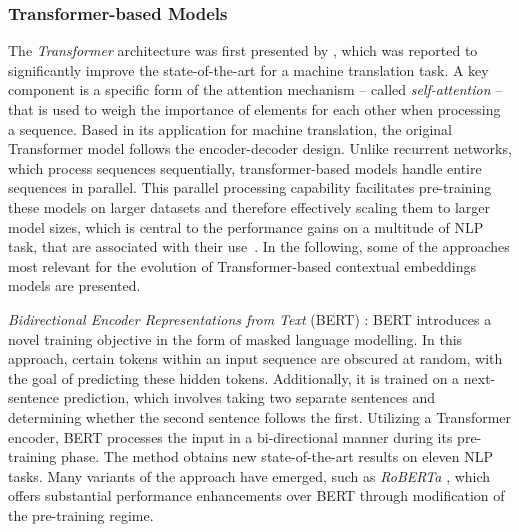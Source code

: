 \documentclass[11pt]{scrreprt}
\let\cite\parencite  %
\begin{document}
\subsubsection{Transformer-based Models}
The \textit{Transformer} architecture was first presented by \cite{vaswaniAttentionAllYou2017}, which was reported to significantly improve the state-of-the-art for a  machine translation task. A key component is a specific form of the attention mechanism -- called \textit{self-attention} -- that is used to weigh the importance of elements for each other when processing a sequence. Based in its application for machine translation, the original Transformer model follows the encoder-decoder design. Unlike recurrent networks, which process sequences sequentially, transformer-based models handle entire sequences in parallel. This parallel processing capability facilitates pre-training these models on larger datasets and therefore effectively scaling them to larger model sizes, which is central to the performance gains on a multitude of NLP task, that are associated with their use \cite{minRecentAdvancesNatural2023}. In the following, some of the approaches most relevant for the evolution of Transformer-based contextual embeddings models are presented.


\textit{Bidirectional Encoder Representations from Text} (BERT) \cite{devlinBERTPretrainingDeep2019}: BERT introduces a novel training objective in the form of masked language modelling. In this approach, certain tokens within an input sequence are obscured at random, with the goal of predicting these hidden tokens. Additionally, it is trained on a next-sentence prediction, which involves taking two separate sentences and determining whether the second sentence follows the first. Utilizing a Transformer encoder, BERT processes the input in a bi-directional manner during its pre-training phase. The method obtains new state-of-the-art results on eleven NLP tasks. Many variants of the approach have emerged, such as \textit{RoBERTa} \cite{liuRoBERTaRobustlyOptimized2019}, which offers substantial performance enhancements over BERT through modification of the pre-training regime.



\end{document}
